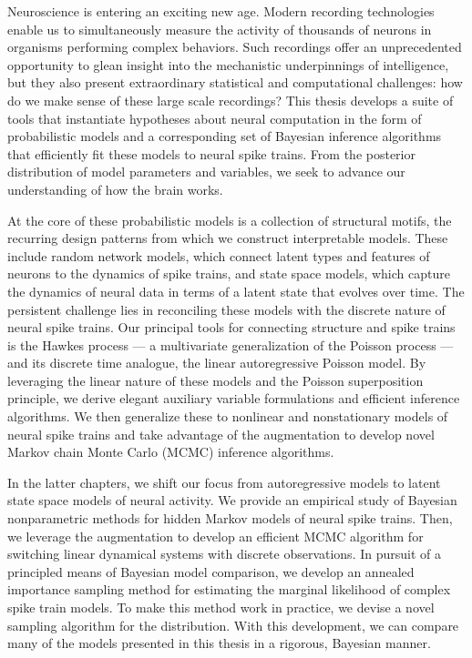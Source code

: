Neuroscience is entering an exciting new age.  Modern recording
technologies enable us to simultaneously measure the activity of
thousands of neurons in organisms performing complex behaviors.  Such
recordings offer an unprecedented opportunity to glean insight into
the mechanistic underpinnings of intelligence, but they also present
extraordinary statistical and computational challenges: how do we make
sense of these large scale recordings?
This thesis develops a suite of tools that instantiate
hypotheses about neural computation in the form of
probabilistic models and a corresponding set of Bayesian inference
algorithms that efficiently fit these models to neural spike trains.
From the posterior distribution of model parameters and variables,
we seek to advance our understanding of how the brain works. 

At the core of these probabilistic models is a collection of
structural motifs, the recurring design patterns from which we
construct interpretable models. These include random network models,
which connect latent types and features of neurons to the dynamics of
spike trains, and state space models, which capture the dynamics of
neural data in terms of a latent state that evolves over time.  The
persistent challenge lies in reconciling these models with the
discrete nature of neural spike trains.  Our principal tools for
connecting structure and spike trains is the Hawkes process --- a
multivariate generalization of the Poisson process --- and its
discrete time analogue, the linear autoregressive Poisson model.  By
leveraging the linear nature of these models and the Poisson
superposition principle, we derive elegant auxiliary variable
formulations and efficient inference algorithms. We then generalize
these to nonlinear and nonstationary models of neural spike trains and
take advantage of the \polyagamma augmentation to develop novel
Markov chain Monte Carlo (MCMC) inference algorithms.

In the latter chapters, we shift our focus from autoregressive models
to latent state space models of neural activity. We provide an
empirical study of Bayesian nonparametric methods for hidden Markov
models of neural spike trains. Then, we leverage the \polyagamma
augmentation to develop an efficient MCMC algorithm for switching
linear dynamical systems with discrete observations.  In pursuit of a
principled means of Bayesian model comparison, we develop an annealed
importance sampling method for estimating the marginal likelihood of 
complex spike train models. To make this method work in practice, 
we devise a novel sampling algorithm for the 
\polyagamma distribution. With this development, we can compare 
many of the models presented in this thesis in a rigorous, Bayesian
manner.

